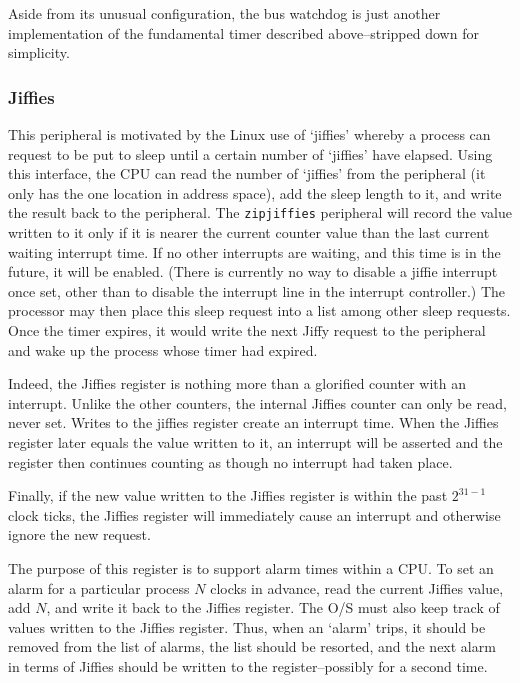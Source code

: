 \documentclass{gqtekspec}
\begin{document}
Aside from its unusual configuration, the bus watchdog is just another
implementation of the fundamental timer described above--stripped down
for simplicity.

\subsubsection{Jiffies}

This peripheral is motivated by the Linux use of `jiffies' whereby a process
can request to be put to sleep until a certain number of `jiffies' have
elapsed.  Using this interface, the CPU can read the number of `jiffies'
from the peripheral (it only has the one location in address space), add the
sleep length to it, and write the result back to the peripheral.  The
{\tt zipjiffies}
peripheral will record the value written to it only if it is nearer the current
counter value than the last current waiting interrupt time.  If no other 
interrupts are waiting, and this time is in the future, it will be enabled.
(There is currently no way to disable a jiffie interrupt once set, other
than to disable the interrupt line in the interrupt controller.)  The processor
may then place this sleep request into a list among other sleep requests.
Once the timer expires, it would write the next Jiffy request to the peripheral
and wake up the process whose timer had expired.

Indeed, the Jiffies register is nothing more than a glorified counter with
an interrupt.  Unlike the other counters, the internal Jiffies counter can only
be read, never set.
Writes to the jiffies register create an interrupt time.  When the Jiffies
register later equals the value written to it, an interrupt will be asserted
and the register then continues counting as though no interrupt had taken
place.

Finally, if the new value written to the Jiffies register is within the past
$2^{31-1}$ clock ticks, the Jiffies register will immediately cause an interrupt
and otherwise ignore the new request.

The purpose of this register is to support alarm times within a CPU.  To
set an alarm for a particular process $N$ clocks in advance, read the current
Jiffies value, add $N$, and write it back to the Jiffies register.  The
O/S must also keep track of values written to the Jiffies register.  Thus,
when an `alarm' trips, it should be removed from the list of alarms, the list
should be resorted, and the next alarm in terms of Jiffies should be written
to the register--possibly for a second time.
\end{document}
